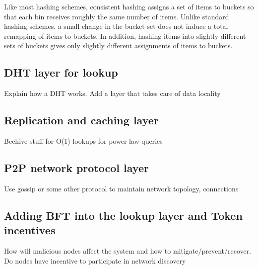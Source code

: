 Like most hashing schemes, consistent hashing assigns a set of items to buckets so that
each bin receives roughly the same number of items.  Unlike standard hashing schemes, a small change in the bucket set
does not induce a total remapping of items to buckets. In addition, hashing items into slightly different sets of
buckets gives only slightly different assignments of items to buckets. 

\subsection{DHT layer for lookup}
Explain how a DHT works. Add a layer that takes care of data locality

\subsection{Replication and caching layer}
Beehive stuff for O(1) lookups for power law queries

\subsection{P2P network protocol layer}
Use gossip or some other protocol to maintain network topology, connections

\subsection{Adding BFT into the lookup layer and Token incentives}
How will malicious nodes affect the system and how to mitigate/prevent/recover. Do nodes have incentive to participate in network discovery
